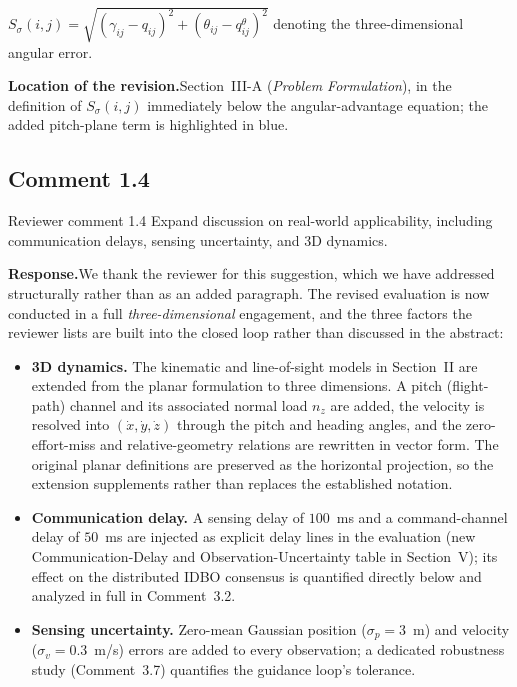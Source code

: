 \documentclass[11pt]{article}
\newcommand{\rsp}{\medskip\noindent\textbf{Response.}\quad}
\newcommand{\loc}{\medskip\noindent\textbf{Location of the revision.}\quad}
\begin{document}
\begin{manuscripttext}
$S_{\sigma}(i,j) = \sqrt{(\gamma_{ij} - q_{ij})^2 + (\theta_{ij} - q^{\theta}_{ij})^2}$ denoting the three-dimensional angular error.
\end{manuscripttext}

\loc Section~III-A (\emph{Problem Formulation}), in the definition of $S_{\sigma}(i,j)$ immediately below the angular-advantage equation; the added pitch-plane term is highlighted in blue.




\subsection*{Comment 1.4}

\begin{reviewercomment}{Reviewer comment 1.4}
Expand discussion on real-world applicability, including communication delays,
sensing uncertainty, and 3D dynamics.
\end{reviewercomment}

\rsp We thank the reviewer for this suggestion, which we have addressed structurally
rather than as an added paragraph. The revised evaluation is now conducted in a full
\emph{three-dimensional} engagement, and the three factors the reviewer lists are
built into the closed loop rather than discussed in the abstract:
\begin{itemize}
  \item \textbf{3D dynamics.} The kinematic and line-of-sight models in Section~II are
  extended from the planar formulation to three dimensions. A pitch (flight-path)
  channel and its associated normal load $n_z$ are added, the velocity is resolved
  into $(\dot x,\dot y,\dot z)$ through the pitch and heading angles, and the
  zero-effort-miss and relative-geometry relations are rewritten in vector form. The
  original planar definitions are preserved as the horizontal projection, so the
  extension supplements rather than replaces the established notation.
  \item \textbf{Communication delay.} A sensing delay of $100$~ms and a command-channel
  delay of $50$~ms are injected as explicit delay lines in the evaluation (new
  Communication-Delay and Observation-Uncertainty table in Section~V); its effect on the
  distributed IDBO consensus is quantified directly below and analyzed in full in
  Comment~3.2.
  \item \textbf{Sensing uncertainty.} Zero-mean Gaussian position ($\sigma_p=3$~m) and
  velocity ($\sigma_v=0.3$~m/s) errors are added to every observation; a dedicated
  robustness study (Comment~3.7) quantifies the guidance loop's tolerance.
\end{itemize}
\end{document}
